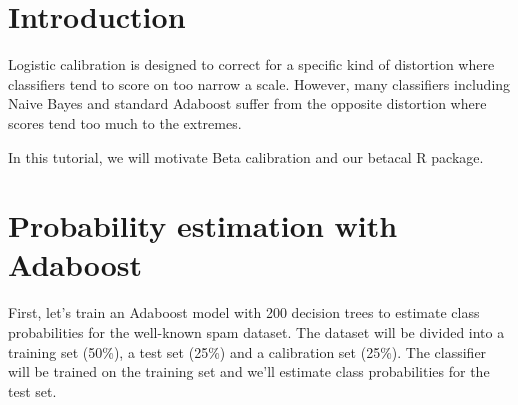\documentclass[oneside]{article}\usepackage[]{graphicx}\usepackage[]{color}
\begin{document}


\section*{Introduction}
Logistic calibration is designed to correct for a specific kind of distortion where classifiers tend to score on too narrow a scale. However, many classifiers including Naive Bayes and standard Adaboost suffer from the opposite distortion where scores tend too much to the extremes.

In this tutorial, we will motivate Beta calibration and our betacal R package.

\section*{Probability estimation with Adaboost}
First, let's train an Adaboost model with 200 decision trees to estimate class probabilities for the well-known spam dataset. The dataset will be divided into a training set (50\%), a test set (25\%) and a calibration set (25\%). The classifier will be trained on the training set and we'll estimate class probabilities for the test set.
\end{document}
